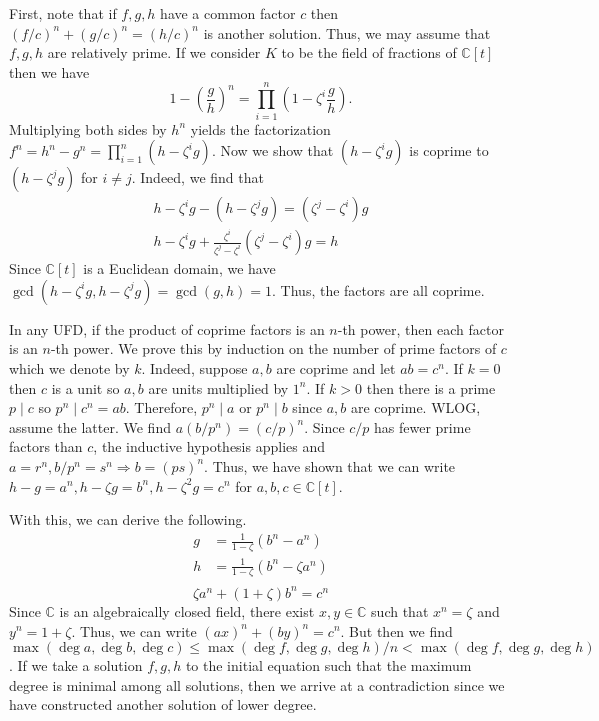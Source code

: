 \documentclass[../../master.tex]{subfiles}
\begin{document}
    \begin{solution}
        First, note that if $f, g, h$ have a common factor $c$ then $(f / c)^{n}
        + (g / c)^{n} = (h / c)^{n}$ is another solution. Thus, we may assume
        that $f, g, h$ are relatively prime. If we consider $K$ to be the field
        of fractions of $\mathbb{C}[t]$ then we have
        \[
            1 - \left( \frac{g}{h} \right)^{n} = \prod_{i = 1}^{n} \left( 1 -
            \zeta^{i} \frac{g}{h} \right).
        \] 
        Multiplying both sides by $h^n$ yields the factorization $f^{n} = h^{n}
        - g^{n} = \prod_{i = 1}^{n} (h - \zeta^{i}g)$. Now we show that $(h -
        \zeta^{i}g)$ is coprime to $(h - \zeta^{j}g)$ for $i \neq j$. Indeed, we
        find that
        \begin{gather*}
            h - \zeta^{i}g - (h - \zeta^{j}g) = (\zeta^{j} - \zeta^{i}) g \\
            h - \zeta^{i}g + \frac{\zeta^{i}}{\zeta^{j} - \zeta^{i}} \left(
            \zeta^{j} - \zeta^{i} \right) g = h
        \end{gather*}
        Since $\mathbb{C}[t]$ is a Euclidean domain, we have $\gcd(h -
        \zeta^{i}g, h - \zeta^{j}g) = \gcd(g, h) = 1$. Thus, the factors are all
        coprime. 

        In any UFD, if the product of coprime factors is an $n$-th
        power, then each factor is an $n$-th power. We prove this by induction
        on the number of prime factors of $c$ which we denote by $k$.
        Indeed, suppose $a, b$ are coprime and let $ab = c^{n}$. If $k = 0$ then
        $c$ is a unit so $a, b$ are units multiplied by $1^{n}$. If $k > 0$ then
        there is a prime $p \mid c$ so $p^{n} \mid c^{n} = ab$. Therefore,
        $p^{n} \mid a$ or $p^{n} \mid b$ since $a, b$ are coprime. WLOG, assume
        the latter. We find $a (b / p^{n}) = (c / p)^{n}$. Since $c / p$ has
        fewer prime factors than $c$, the inductive hypothesis applies and $a =
        r^{n}, b / p^{n} = s^{n} \Longrightarrow b = (ps)^{n}$. Thus, we have
        shown that we can write $h - g = a^{n}, h - \zeta g = b^{n}, h -
        \zeta^{2} g = c^{n}$ for $a, b, c \in \mathbb{C}[t]$. 

        With this, we can derive the following.
        \begin{align*}
            g &= \frac{1}{1 - \zeta} (b^{n} - a^{n}) \\
            h &= \frac{1}{1 - \zeta} (b^{n} - \zeta a^{n}) \\
        \end{align*}
        \[
            \zeta a^{n} + (1 + \zeta) b^{n} = c^{n}
        \] 
        Since $\mathbb{C}$ is an algebraically closed field, there exist $x, y
        \in \mathbb{C}$ such that $x^{n} = \zeta$ and $y^{n} = 1 + \zeta$. Thus,
        we can write $(ax)^{n} + (by)^{n} = c^{n}$. But then we find $\max(\deg
        a, \deg b, \deg c) \leq \max(\deg f, \deg g, \deg h) / n < \max(\deg f,
        \deg g, \deg h)$. If we take a solution $f, g, h$ to the initial
        equation such that the maximum degree is minimal among all solutions,
        then we arrive at a contradiction since we have constructed another
        solution of lower degree.
    \end{solution}
\end{document}
